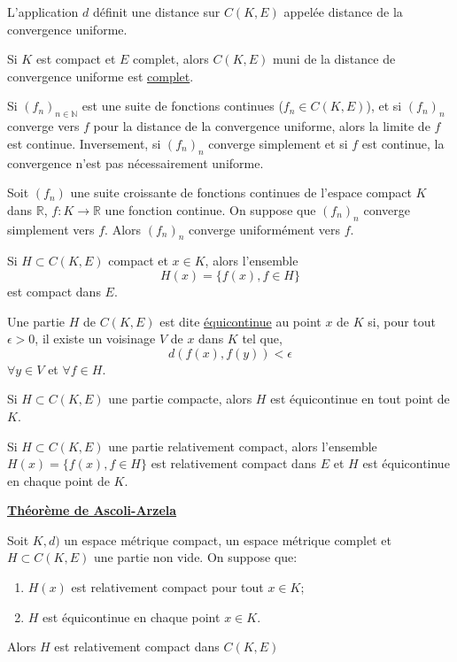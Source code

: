 \documentclass[12pt,a4paper]{article}
\begin{document}
\begin{flushleft}
\begin{thm}
L'application $d$ définit une distance sur $C(K,E)$ appelée distance de la convergence uniforme.
 \end{thm}


\begin{thm}
Si $K$ est compact et $E$ complet, alors $C(K,E)$ muni de la distance de convergence uniforme est \underline{complet}.
 \end{thm}


\begin{rem}
Si $(f_n)_{n \in \mathbb{N}}$ est une suite de fonctions continues ($f_n \in C(K,E)$), et si $(f_n)_n$ converge vers $f$ pour la distance de la convergence uniforme, alors la limite de $f$ est continue. Inversement, si $(f_n)_n$ converge simplement et si $f$ est continue, la convergence n'est pas nécessairement uniforme.
 \end{rem}


\begin{thm}
Soit $(f_n)$ une suite croissante de fonctions continues de l'espace compact $K$ dans $\mathbb{R}$, $f: K \longrightarrow \mathbb{R}$ une fonction continue. On suppose que $(f_n)_n$ converge simplement vers $f$. Alors $(f_n)_n$ converge uniformément vers $f$.
 \end{thm}


\begin{thm}
Si $H \subset C(K,E)$ compact et $x \in K$, alors l'ensemble $$H(x) = \{ f(x), f \in H \}$$ est compact dans $E$.
 \end{thm}


\begin{mydef}
Une partie $H$ de $C(K,E)$ est dite \underline{équicontinue} au point $x$ de $K$ si, pour tout $ \epsilon > 0$, il existe un voisinage $V$ de $x$ dans $K$ tel que, $$d(f(x),f(y)) < \epsilon$$ $\forall y \in V$ et $\forall f \in H$. 
 \end{mydef}


\begin{thm}
Si $H \subset C(K,E)$ une partie compacte, alors $H$ est équicontinue en tout point de $K$.
 \end{thm}


\begin{thm}
Si $H \subset C(K,E)$ une partie relativement compact, alors l'ensemble $H(x) = \{ f(x), f \in H \}$ est relativement compact dans $E$ et $H$ est équicontinue en chaque point de $K$.
\end{thm}

\underline{\textbf{Théorème de Ascoli-Arzela}}
\begin{thm}
Soit $K,d)$ un espace métrique compact, \edm un espace métrique complet et $H \subset C(K,E)$ une partie non vide. On suppose que:
\begin{enumerate}
\item $H(x)$ est relativement compact pour tout $x \in K$;
\item $H$ est équicontinue en chaque point $x \in K$.
\end{enumerate}
Alors $H$ est relativement compact dans $C(K,E)$
\end{thm}


\end{flushleft}
\end{document}

